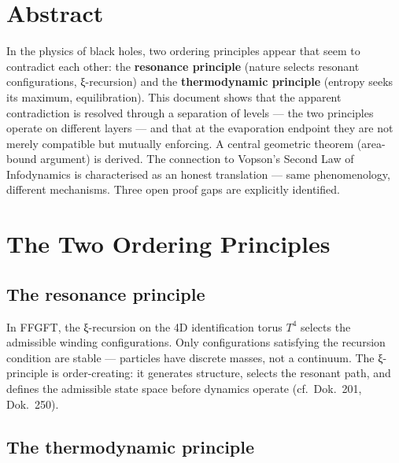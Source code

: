
\section*{Abstract}

In the physics of black holes, two ordering principles appear that seem to contradict each other: the \textbf{resonance principle} (nature selects resonant configurations, ξ-recursion) and the \textbf{thermodynamic principle} (entropy seeks its maximum, equilibration). This document shows that the apparent contradiction is resolved through a separation of levels --- the two principles operate on different layers --- and that at the evaporation endpoint they are not merely compatible but mutually enforcing. A central geometric theorem (area-bound argument) is derived. The connection to Vopson's Second Law of Infodynamics is characterised as an honest translation --- same phenomenology, different mechanisms. Three open proof gaps are explicitly identified.

\tableofcontents
\newpage

\section{The Two Ordering Principles}

\subsection{The resonance principle}

In FFGFT, the ξ-recursion on the 4D identification torus $T^4$ selects the admissible winding configurations. Only configurations satisfying the recursion condition are stable --- particles have discrete masses, not a continuum. The ξ-principle is order-creating: it generates structure, selects the resonant path, and defines the admissible state space before dynamics operate (cf.\ Dok.~201, Dok.~250).

\subsection{The thermodynamic principle}

